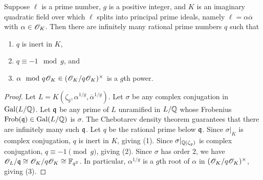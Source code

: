 \documentclass{amsart}
\begin{document}
\begin{lemma}\label{lem:K-exists}
  Suppose $\ell$ is a prime number, $g$ is a positive integer, and $K$ is an imaginary quadratic field over which $\ell$ splits into principal prime ideals, namely $\ell = \alpha\overline{\alpha}$ with $\alpha\in \mathscr{O}_K$.
Then there are infinitely many rational prime numbers $q$ such that
    \begin{enumerate}
      \item $q$ is inert in $K$,
      \item $q \equiv -1 \mod{g}$, and
      \item $\alpha \mod q\mathscr{O}_K \in (\mathscr{O}_K/q\mathscr{O}_K)^\times$ is a $g$th power.
    \end{enumerate}
\end{lemma}
\begin{proof}
  Let $L = K(\zeta_g,\alpha^{1/g},\overline{\alpha}^{1/g})$.
  Let $\sigma$ be any complex conjugation in $\operatorname{Gal}(L/\mathbb{Q})$.
  Let $\frak{q}$ be any prime of $L$ unramified in $L/\mathbb{Q}$ whose Frobenius $\mathrm{Frob}(\frak{q}) \in \operatorname{Gal}(L/\mathbb{Q})$ is $\sigma$. The Chebotarev density theorem guarantees that there are infinitely many such $\frak{q}$.
  Let $q$ be the rational prime below $\frak{q}$.
  Since $\sigma|_K$ is complex conjugation, $q$ is inert in $K$, giving (1).
  Since $\sigma|_{\mathbb{Q}(\zeta_g)}$ is complex conjugation, $q \equiv -1 \pmod{g}$, giving (2).
Since $\sigma$ has order $2$, we have $\mathscr{O}_L/\frak{q} \cong \mathscr{O}_K/q\mathscr{O}_K \cong \mathbb{F}_{q^2}$. In particular, $\alpha^{1/g}$ is a $g$th root of $\alpha$ in $(\mathscr{O}_K/q\mathscr{O}_K)^\times$, giving (3).
\end{proof}
\end{document}
